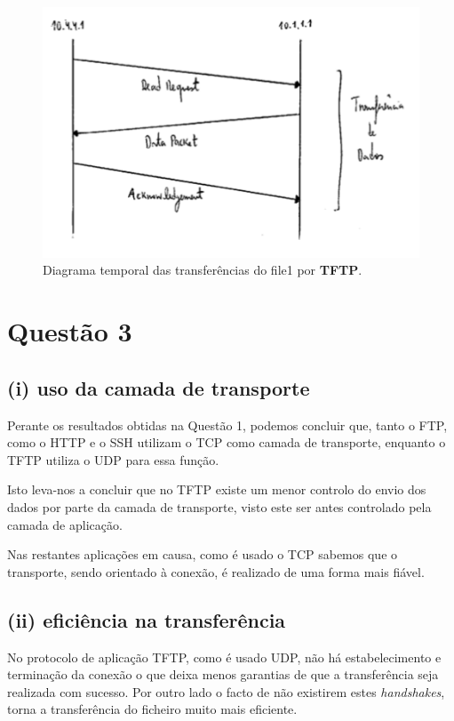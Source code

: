\documentclass{llncs}
\begin{document}
\begin{figure}[H]
\begin{center}
\includegraphics[scale=0.5]{2_tftp.png}
\end{center}
\caption{\label{fig:ssh}Diagrama temporal das transferências do file1 por \textbf{TFTP}.}
\end{figure}

\section{Questão 3}
\subsection{(i) uso da camada de transporte}
Perante os resultados obtidas na Questão 1, podemos concluir que, tanto o FTP, como o HTTP e o SSH utilizam o TCP como camada de transporte, enquanto o TFTP utiliza o UDP para essa função.

Isto leva-nos a concluir que no TFTP existe um menor controlo do envio dos dados por parte da camada de transporte, visto este ser antes controlado pela camada de aplicação.

Nas restantes aplicações em causa, como é usado o TCP sabemos que o transporte, sendo orientado à conexão, é realizado de uma forma mais fiável.

\subsection{(ii) eficiência na transferência}
No protocolo de aplicação TFTP, como é usado UDP, não há estabelecimento e terminação da conexão o que deixa menos garantias de que a transferência seja realizada com sucesso. Por outro lado o facto de não existirem estes \emph{handshakes}, torna a transferência do ficheiro muito mais eficiente.
\end{document}
